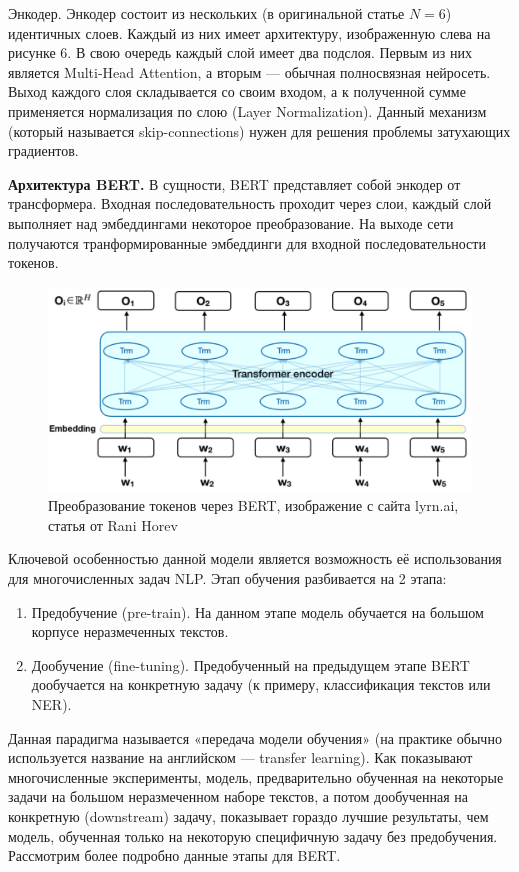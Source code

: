 \documentclass[12pt,a4paper]{article}
\begin{document}
Энкодер. Энкодер состоит из нескольких (в оригинальной статье $N = 6$) идентичных слоев. Каждый из них имеет архитектуру, изображенную слева на рисунке 6. В свою очередь каждый слой имеет два подслоя. Первым из них является Multi-Head Attention, а вторым --- обычная полносвязная нейросеть. Выход каждого слоя складывается со своим входом, а к полученной сумме применяется нормализация по слою (Layer Normalization). Данный механизм (который называется skip-connections) нужен для решения проблемы затухающих градиентов. 


\textbf{Архитектура BERT.} В сущности, BERT\cite{bert} представляет собой энкодер от трансформера. Входная последовательность проходит через слои, каждый слой выполняет над эмбеддингами некоторое преобразование. На выходе сети получаются транформированные эмбеддинги для входной последовательности токенов.

\begin{figure}[H]
	\begin{center}
		\includegraphics[scale=0.3]{trans2.png}
	\end{center}
	\caption{Преобразование токенов через BERT, изображение с сайта lyrn.ai, статья от Rani Horev}
\end{figure}

Ключевой особенностью данной модели является возможность её использования для многочисленных задач NLP. Этап обучения разбивается на 2 этапа:
\begin{enumerate}
    \item Предобучение (pre-train). На данном этапе модель обучается на большом корпусе неразмеченных текстов.
    \item Дообучение (fine-tuning). Предобученный на предыдущем этапе BERT дообучается на конкретную задачу (к примеру, классификация текстов или NER).
\end{enumerate}

\noindent Данная парадигма называется «передача модели обучения» (на практике обычно используется название на английском --- transfer learning). Как показывают многочисленные эксперименты, модель, предварительно обученная на некоторые задачи на большом неразмеченном наборе текстов, а потом дообученная на конкретную (downstream) задачу, показывает гораздо лучшие результаты, чем модель, обученная только на некоторую специфичную задачу без предобучения. Рассмотрим более подробно данные этапы для BERT.
\end{document}
